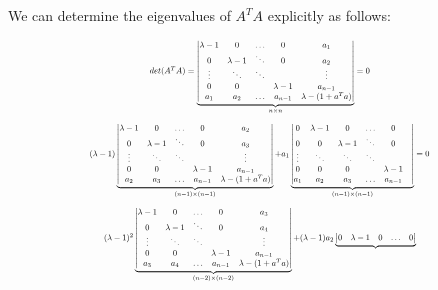 \documentclass[12pt]{article}
\newcommand*{\Scale}[2][4]{\scalebox{#1}{$#2$}}
\begin{document}
\begin{itemize}
We can determine the eigenvalues of $A^TA$ explicitly as follows:

$$\Scale[0.6]{det(A^TA) = \underbrace{\begin{vmatrix}
			\lambda - 1 & 0 & \hdots & 0 & a_1 \\
			0 & \lambda - 1 & \ddots & 0 & a_2 \\
			\vdots & \ddots & \ddots &  & \vdots \\
			0 & 0 &  & \lambda - 1 & a_{n-1} \\
			a_1 & a_2 & \hdots & a_{n-1} & \lambda - (1+a^Ta) \\
			\end{vmatrix}}_{n\times n} = 0 }$$
$$\Scale[0.6]{(\lambda - 1)\underbrace{\begin{vmatrix}
			\lambda - 1 & 0 & \hdots & 0 & a_2 \\
			0 & \lambda - 1 & \ddots & 0 & a_3 \\
			\vdots & \ddots & \ddots &  & \vdots \\
			0 & 0 &  & \lambda - 1 & a_{n-1} \\
			a_2 & a_3 & \hdots & a_{n-1} & \lambda - (1+a^Ta) \\
			\end{vmatrix}}_{(n-1)\times(n-1)} + a_1\underbrace{\begin{vmatrix}
					0 & \lambda - 1 & 0 & \hdots & 0 \\
					0 & 0 & \lambda - 1 & \ddots & 0 \\
					\vdots & \ddots & \ddots & \ddots &  \\
					0 & 0 & 0 &  & \lambda - 1 & \\
					a_1 & a_2 & a_3 & \hdots & a_{n-1} \\
					\end{vmatrix}}_{(n-1)\times(n-1)} = 0}$$
$$\Scale[0.6]{(\lambda - 1)^2\underbrace{\begin{vmatrix}
			\lambda - 1 & 0 & \hdots & 0 & a_3 \\
			0 & \lambda - 1 & \ddots & 0 & a_4 \\
			\vdots & \ddots & \ddots &  & \vdots \\
			0 & 0 &  & \lambda - 1 & a_{n-1} \\
			a_3 & a_4 & \hdots & a_{n-1} & \lambda - (1+a^Ta) \\
			\end{vmatrix}}_{(n-2)\times(n-2)} + (\lambda - 1)a_2\underbrace{\begin{vmatrix}
					0 & \lambda - 1 & 0 & \hdots & 0 \\

\end{vmatrix}}}$$
\end{itemize}
\end{document}
